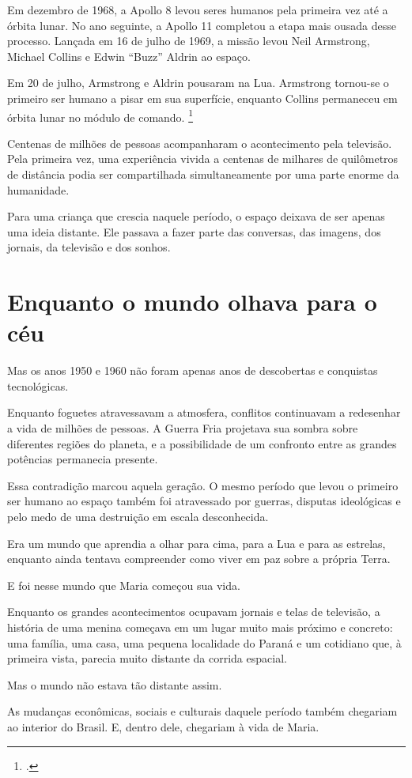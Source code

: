 Em dezembro de 1968, a Apollo 8 levou seres humanos pela primeira
vez até a órbita lunar. No ano seguinte, a Apollo 11 completou a
etapa mais ousada desse processo. Lançada em 16 de julho de 1969,
a missão levou Neil Armstrong, Michael Collins e Edwin ``Buzz''
Aldrin ao espaço.

Em 20 de julho, Armstrong e Aldrin pousaram na Lua. Armstrong tornou-se
o primeiro ser humano a pisar em sua superfície, enquanto Collins
permaneceu em órbita lunar no módulo de comando.%
\footcite{nasa1969apollo11}

Centenas de milhões de pessoas acompanharam o acontecimento pela
televisão. Pela primeira vez, uma experiência vivida a centenas de
milhares de quilômetros de distância podia ser compartilhada
simultaneamente por uma parte enorme da humanidade.

Para uma criança que crescia naquele período, o espaço deixava de
ser apenas uma ideia distante. Ele passava a fazer parte das
conversas, das imagens, dos jornais, da televisão e dos sonhos.

\section*{Enquanto o mundo olhava para o céu}

Mas os anos 1950 e 1960 não foram apenas anos de descobertas e
conquistas tecnológicas.

Enquanto foguetes atravessavam a atmosfera, conflitos continuavam
a redesenhar a vida de milhões de pessoas. A Guerra Fria projetava
sua sombra sobre diferentes regiões do planeta, e a possibilidade
de um confronto entre as grandes potências permanecia presente.

Essa contradição marcou aquela geração. O mesmo período que levou
o primeiro ser humano ao espaço também foi atravessado por guerras,
disputas ideológicas e pelo medo de uma destruição em escala
desconhecida.

Era um mundo que aprendia a olhar para cima, para a Lua e para as
estrelas, enquanto ainda tentava compreender como viver em paz
sobre a própria Terra.

E foi nesse mundo que Maria começou sua vida.

Enquanto os grandes acontecimentos ocupavam jornais e telas de
televisão, a história de uma menina começava em um lugar muito
mais próximo e concreto: uma família, uma casa, uma pequena
localidade do Paraná e um cotidiano que, à primeira vista, parecia
muito distante da corrida espacial.

Mas o mundo não estava tão distante assim.

As mudanças econômicas, sociais e culturais daquele período também
chegariam ao interior do Brasil. E, dentro dele, chegariam à vida
de Maria.